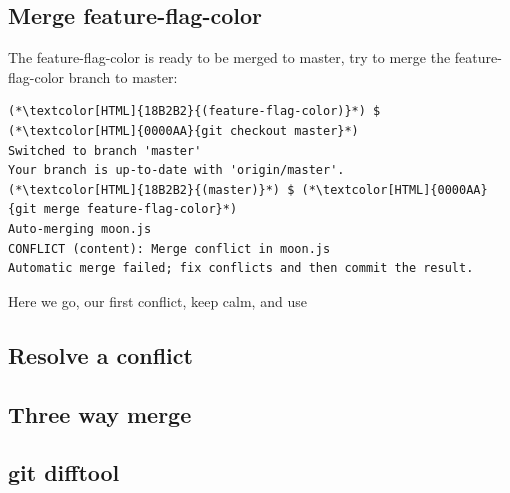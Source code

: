\subsection{Merge feature-flag-color}
\begin{frame}[fragile]
    \subslidetitle

  The feature-flag-color is ready to be merged to master, try to merge the feature-flag-color branch to master:
\begin{lstlisting}
(*\textcolor[HTML]{18B2B2}{(feature-flag-color)}*) $ (*\textcolor[HTML]{0000AA}{git checkout master}*)
Switched to branch 'master'
Your branch is up-to-date with 'origin/master'.
(*\textcolor[HTML]{18B2B2}{(master)}*) $ (*\textcolor[HTML]{0000AA}{git merge feature-flag-color}*)
Auto-merging moon.js
CONFLICT (content): Merge conflict in moon.js
Automatic merge failed; fix conflicts and then commit the result.
\end{lstlisting}

Here we go, our first conflict, keep calm, and use 

\end{frame}

\subsection{Resolve a conflict}
\begin{frame}[fragile]
    \subslidetitle
\end{frame}

\subsection{Three way merge}
\begin{frame}[fragile]
    \subslidetitle
\end{frame}

\subsection{git difftool}
\begin{frame}[fragile]
    \subslidetitle
\end{frame}

